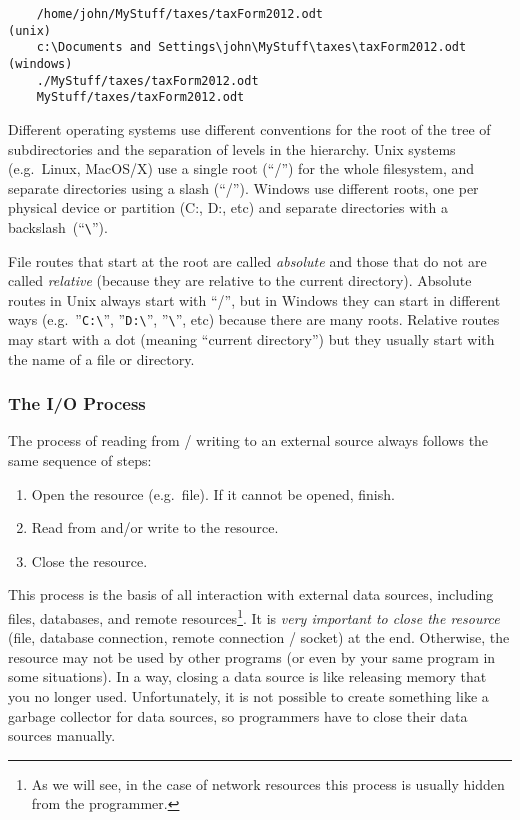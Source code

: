 \begin{verbatim}
    /home/john/MyStuff/taxes/taxForm2012.odt                     (unix)
    c:\Documents and Settings\john\MyStuff\taxes\taxForm2012.odt (windows)
    ./MyStuff/taxes/taxForm2012.odt
    MyStuff/taxes/taxForm2012.odt
\end{verbatim}

Different operating systems use different conventions for the root of
the tree of subdirectories and the separation of levels in the 
hierarchy. Unix systems (e.g.~Linux, MacOS/X) use a single root
(``/'') for the whole filesystem, and separate directories using a
slash (``/''). Windows use different roots, one per physical device or
partition (C:, D:, etc) and separate directories with a 
backslash~(``\verb+\+''). 

File routes that start at the root are called \emph{absolute} and
those that do not are called \emph{relative} (because they are
relative to the current directory). Absolute routes in
Unix always start with ``/'', but in Windows they can start in
different ways (e.g.~''\verb+C:\+'', ''\verb+D:\+'', ''\verb+\+'',
etc) because there are many roots. Relative routes may start with
a dot (meaning ``current directory'') but they usually start with the
name of a file or directory. 


\subsubsection{The I/O Process}
\label{sec:process}

The process of reading from / writing to an external source always
follows the same sequence of steps:

\begin{enumerate}
\item Open the resource (e.g.~file). If it cannot be opened, finish.
\item Read from and/or write to the resource.
\item Close the resource. 
\end{enumerate}

This process is the basis of all interaction with external data
sources, including files, databases, and remote resources\footnote{As
  we will see, in the case of network resources this process is
  usually hidden from the programmer.}.
It is \emph{very important to close the resource} (file, database
connection, remote connection / socket) at the
end. Otherwise, the resource may not be used by other programs (or
even by your same program in some situations). In a way, closing a
data source is like releasing memory that you no longer
used. Unfortunately, it is not possible to create something like a
garbage collector for data sources, so programmers have to close their
data sources manually.

